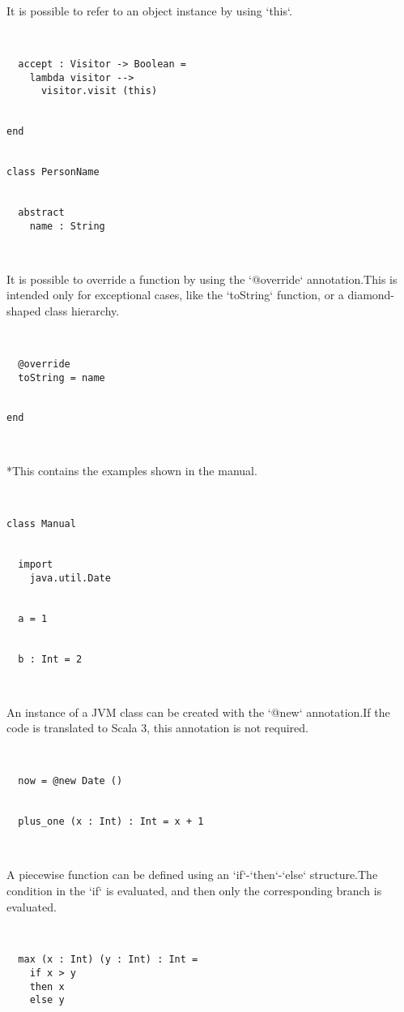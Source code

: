 It is possible to refer to an object instance by using `this`. 


\begin{lstlisting}


  accept : Visitor -> Boolean =
    lambda visitor -->
      visitor.visit (this)


end


class PersonName


  abstract
    name : String



\end{lstlisting}

It is possible to override a function by using the `@override` annotation.This is intended only for exceptional cases, like the `toString` function, or a diamond-shaped class hierarchy. 


\begin{lstlisting}


  @override
  toString = name


end



\end{lstlisting}

  *This contains the examples shown in the manual.


\begin{lstlisting}


class Manual


  import
    java.util.Date


  a = 1


  b : Int = 2



\end{lstlisting}

An instance of a JVM class can be created with the `@new` annotation.If the code is translated to Scala 3, this annotation is not required. 


\begin{lstlisting}


  now = @new Date ()


  plus_one (x : Int) : Int = x + 1



\end{lstlisting}

A piecewise function can be defined using an `if`-`then`-`else` structure.The condition in the `if` is evaluated, and then only the corresponding branch is evaluated. 


\begin{lstlisting}


  max (x : Int) (y : Int) : Int =
    if x > y
    then x
    else y



\end{lstlisting}

